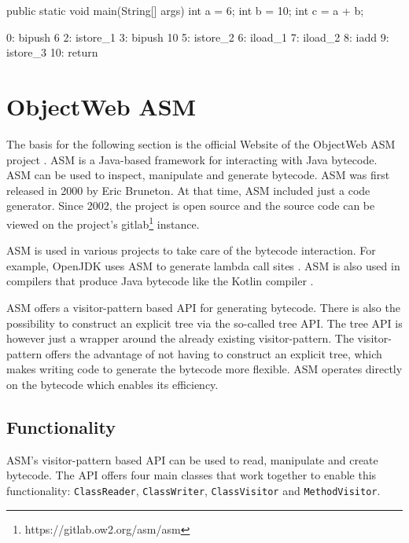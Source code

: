 \begin{JavaCode}[float,numbers=none,caption=Initialization of two variables and a third one with the sum of the first two variables in Java., label=lst:JavaNumberAdd]
public static void main(String[] args) {
    int a = 6;
    int b = 10;
    int c = a + b;
}
\end{JavaCode}

\begin{Bytecode}[float,numbers=none,caption=Bytecode of the Java program shown in listing \ref{lst:JavaNumberAdd}., label=lst:JavaNumberAddBytecode]
 0: bipush        6
 2: istore_1
 3: bipush        10
 5: istore_2
 6: iload_1
 7: iload_2
 8: iadd
 9: istore_3
10: return
\end{Bytecode}

\section{ObjectWeb ASM}

The basis for the following section is the official Website of the ObjectWeb ASM project \parencite{ASMWeb2024}. ASM is a Java-based framework for interacting with Java bytecode. ASM can be used to inspect, manipulate and generate bytecode. ASM was first released in 2000 by Eric Bruneton. At that time, ASM included just a code generator. Since 2002, the project is open source and the source code can be viewed on the project's gitlab\footnote{https://gitlab.ow2.org/asm/asm} instance. 

ASM is used in various projects to take care of the bytecode interaction. For example, OpenJDK uses ASM to generate lambda call sites \parencite{OpenJdk2024}. ASM is also used in compilers that produce Java bytecode like the Kotlin compiler \parencite{Kotlin2024}. 

ASM offers a visitor-pattern based API for generating bytecode. There is also the possibility to construct an explicit tree via the so-called tree API. The tree API is however just a wrapper around the already existing visitor-pattern. The visitor-pattern offers the advantage of not having to construct an explicit tree, which makes writing code to generate the bytecode more flexible. ASM operates directly on the bytecode which enables its efficiency.     

\subsection{Functionality}

ASM's visitor-pattern based API can be used to read, manipulate and create bytecode. The API offers four main classes that work together to enable this functionality: \texttt{ClassReader}, \texttt{ClassWriter}, \texttt{ClassVisitor} and \texttt{MethodVisitor}. 

